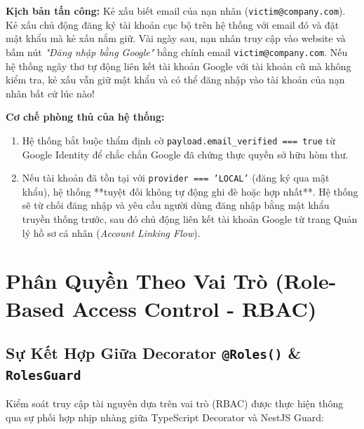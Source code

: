 \documentclass[12pt,a4paper,oneside]{book}
\begin{document}
\begin{warningbox}
  \textbf{Kịch bản tấn công:} Kẻ xấu biết email của nạn nhân (\texttt{victim@company.com}). Kẻ xấu chủ động đăng ký tài khoản cục bộ trên hệ thống với email đó và đặt mật khẩu mà kẻ xấu nắm giữ. Vài ngày sau, nạn nhân truy cập vào website và bấm nút \textit{"Đăng nhập bằng Google"} bằng chính email \texttt{victim@company.com}. Nếu hệ thống ngây thơ tự động liên kết tài khoản Google với tài khoản cũ mà không kiểm tra, kẻ xấu vẫn giữ mật khẩu và có thể đăng nhập vào tài khoản của nạn nhân bất cứ lúc nào!
  
  \textbf{Cơ chế phòng thủ của hệ thống:}
  \begin{enumerate}
    \item Hệ thống bắt buộc thẩm định cờ \texttt{payload.email\_verified === true} từ Google Identity để chắc chắn Google đã chứng thực quyền sở hữu hòm thư.
    \item Nếu tài khoản đã tồn tại với \texttt{provider === 'LOCAL'} (đăng ký qua mật khẩu), hệ thống **tuyệt đối không tự động ghi đè hoặc hợp nhất**. Hệ thống sẽ từ chối đăng nhập và yêu cầu người dùng đăng nhập bằng mật khẩu truyền thống trước, sau đó chủ động liên kết tài khoản Google từ trang Quản lý hồ sơ cá nhân (\textit{Account Linking Flow}).
  \end{enumerate}
\end{warningbox}

\chapter{Phân Quyền Theo Vai Trò (Role-Based Access Control - RBAC)}

\section{Sự Kết Hợp Giữa Decorator \texttt{@Roles()} \& \texttt{RolesGuard}}
Kiểm soát truy cập tài nguyên dựa trên vai trò (RBAC) được thực hiện thông qua sự phối hợp nhịp nhàng giữa TypeScript Decorator và NestJS Guard:
\end{document}
